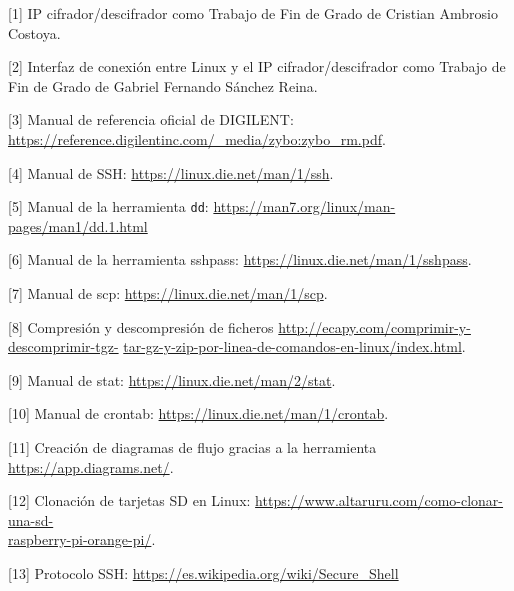 \hspace{0.5cm}	[\hypertarget{1}{1}] IP cifrador/descifrador como Trabajo de Fin de Grado de Cristian Ambrosio Costoya.

\hspace{0.5cm}	[\hypertarget{2}{2}] Interfaz de conexión entre Linux y el IP cifrador/descifrador como Trabajo de Fin de Grado de Gabriel Fernando Sánchez Reina.

\hspace{0.5cm}	[\hypertarget{3}{3}] Manual de referencia oficial de DIGILENT: \url{https://reference.digilentinc.com/_media/zybo:zybo_rm.pdf}.

\hspace{0.5cm}	[\hypertarget{4}{4}] Manual de SSH: \url{https://linux.die.net/man/1/ssh}.

\hspace{0.5cm}	[\hypertarget{5}{5}] Manual de la herramienta \texttt{dd}: \url{https://man7.org/linux/man-pages/man1/dd.1.html}

\hspace{0.5cm}	[\hypertarget{6}{6}] Manual de la herramienta sshpass: \url{https://linux.die.net/man/1/sshpass}.

\hspace{0.5cm}	[\hypertarget{7}{7}] Manual de scp: \url{https://linux.die.net/man/1/scp}.

\hspace{0.5cm}	[\hypertarget{8}{8}] Compresión y descompresión de ficheros \url{http://ecapy.com/comprimir-y-descomprimir-tgz-} \url{tar-gz-y-zip-por-linea-de-comandos-en-linux/index.html}.

\hspace{0.5cm}	[\hypertarget{9}{9}] Manual de stat: \url{https://linux.die.net/man/2/stat}.

\hspace{0.5cm}	[\hypertarget{10}{10}] Manual de crontab: \url{https://linux.die.net/man/1/crontab}.	
	
\hspace{0.5cm}	[\hypertarget{11}{11}] Creación de diagramas de flujo gracias a la herramienta \url{https://app.diagrams.net/}.
	
\hspace{0.5cm}	[\hypertarget{12}{12}] Clonación de tarjetas SD en Linux: \url{https://www.altaruru.com/como-clonar-una-sd-}\\
	\url{raspberry-pi-orange-pi/}.

\hspace{0.5cm}	[\hypertarget{13}{13}] Protocolo SSH: \url{https://es.wikipedia.org/wiki/Secure_Shell}

